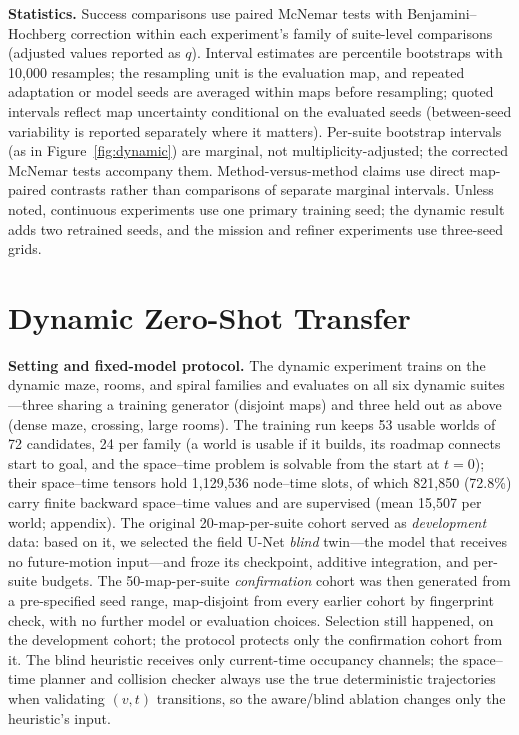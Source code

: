 \documentclass[letterpaper]{article} %
\begin{document}
\textbf{Statistics.} Success comparisons use paired McNemar tests with Benjamini--Hochberg correction within each experiment's family of suite-level comparisons (adjusted values reported as $q$). Interval estimates are percentile bootstraps with 10{,}000 resamples; the resampling unit is the evaluation map, and repeated adaptation or model seeds are averaged within maps before resampling; quoted intervals reflect map uncertainty conditional on the evaluated seeds (between-seed variability is reported separately where it matters). Per-suite bootstrap intervals (as in Figure~\ref{fig:dynamic}) are marginal, not multiplicity-adjusted; the corrected McNemar tests accompany them. Method-versus-method claims use direct map-paired contrasts rather than comparisons of separate marginal intervals. Unless noted, continuous experiments use one primary training seed; the dynamic result adds two retrained seeds, and the mission and refiner experiments use three-seed grids.

\section{Dynamic Zero-Shot Transfer}

\textbf{Setting and fixed-model protocol.} The dynamic experiment trains on the dynamic maze, rooms, and spiral families and evaluates on all six dynamic suites---three sharing a training generator (disjoint maps) and three held out as above (dense maze, crossing, large rooms). The training run keeps 53 usable worlds of 72 candidates, 24 per family (a world is usable if it builds, its roadmap connects start to goal, and the space--time problem is solvable from the start at $t{=}0$); their space--time tensors hold 1{,}129{,}536 node--time slots, of which 821{,}850 (72.8\%) carry finite backward space--time values and are supervised (mean 15{,}507 per world; appendix). The original 20-map-per-suite cohort served as \emph{development} data: based on it, we selected the field U-Net \emph{blind} twin---the model that receives no future-motion input---and froze its checkpoint, additive integration, and per-suite budgets. The 50-map-per-suite \emph{confirmation} cohort was then generated from a pre-specified seed range, map-disjoint from every earlier cohort by fingerprint check, with no further model or evaluation choices. Selection still happened, on the development cohort; the protocol protects only the confirmation cohort from it. The blind heuristic receives only current-time occupancy channels; the space--time planner and collision checker always use the true deterministic trajectories when validating $(v,t)$ transitions, so the aware/blind ablation changes only the heuristic's input.
\end{document}
